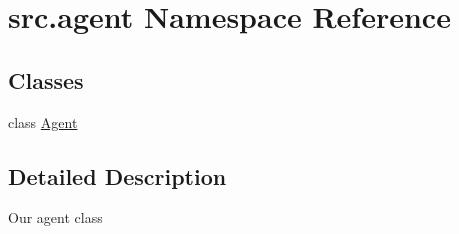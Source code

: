 \hypertarget{namespacesrc_1_1agent}{}\section{src.\+agent Namespace Reference}
\label{namespacesrc_1_1agent}
\subsection*{Classes}
\begin{DoxyCompactItemize}
\item 
class \hyperlink{classsrc_1_1agent_1_1_agent}{Agent}
\end{DoxyCompactItemize}


\subsection{Detailed Description}
\begin{DoxyVerb}Our agent class\end{DoxyVerb}
 